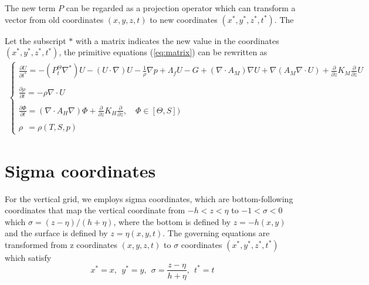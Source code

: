 \documentclass[oribibl]{llncs}
\begin{document}
The new term $P$ can be regarded as a projection operator which can transform a vector from old  coordinates $(x,y,z,t)$ to new 
coordinates $(x^*,y^*,z^*,t^*)$. The 

Let the subscript $*$ with a matrix indicates the new value in the coordinates $(x^*,y^*,z^*,t^*)$, the primitive equations (\ref{eq:matrix}) can be rewritten as
\begin{eqnarray}\label{eq:matrix}
\left \{
\begin{array}{l}  
\frac{\partial U}{\partial t^*} = -(P_t^\Theta \nabla^*) U - (U \cdot  \nabla){U}  - \frac{1}{\rho} \nabla {p} +\Lambda_f U - G +  (\nabla \cdot  A_M) \nabla U + \nabla(A_M \nabla \cdot U)+ \frac{\partial }{\partial z} K_M  \frac{\partial }{\partial z}U  \\   \\ 
\frac{\partial \rho}{\partial t} = - \rho \nabla \cdot U  \\  \\ 
\frac{\partial {\Phi}}{\partial t}= (\nabla \cdot A_H   \nabla) \Phi   + \frac{\partial }{\partial z} K_H  \frac{\partial }{\partial z}, \quad \Phi  \in [\Theta,S])  \\  \\ 
\rho \ \ = \rho(T,S,p) 
\end{array}
\right.
\end{eqnarray}


\section{Sigma coordinates}
For the vertical grid, we employs sigma coordinates, which are bottom-following coordinates that map the vertical coordinate from $-h < z < \eta$ to $-1 < \sigma < 0$ which $\sigma  = (z-\eta)/(h + \eta)$, where the bottom is defined by $z =-h(x, y)$ and the surface is defined by $z = \eta(x, y, t)$. The governing equations are transformed from z coordinates $(x,y,z,t)$ to $\sigma$ coordinates $(x^*,y^*,z^*,t^*)$ which satisfy
\begin{equation}
x^*=x,\ \ y^*=y,\ \ \sigma=\frac{z-\eta}{h+\eta},\ \ t^*=t
\end{equation}
\end{document}
